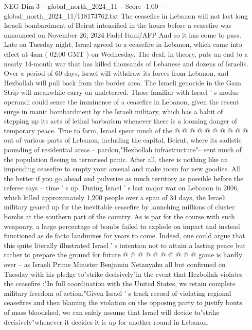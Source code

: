 \begin{textsample}{NEG Dim 3 – global\_north\_2024\_11 – Score -1.00 – global\_north\_2024\_11/118173762.txt}  \label{ex:f3_neg_282}
The ceasefire in Lebanon will not last long Israeli bombardment of Beirut intensified in the hours before a ceasefire was announced on November 26, 2024 Fadel Itani/AFP And so it has come to pass.
Late on Tuesday night, Israel agreed to a ceasefire in Lebanon, which came into effect at 4am ( 02:00 GMT ) on Wednesday.
The deal, in theory, puts an end to a nearly 14-month war that has killed thousands of Lebanese and dozens of Israelis.
Over a period of 60 days, Israel will withdraw its forces from Lebanon, and Hezbollah will pull back from the border area.
The Israeli genocide in the Gaza Strip will meanwhile carry on undeterred.
Those familiar with Israel ' s modus operandi could sense the imminence of a ceasefire in Lebanon, given the recent surge in manic bombardment by the Israeli military, which has a habit of stepping up its acts of lethal barbarism whenever there is a looming danger of temporary peace.
True to form, Israel spent much of the @ @ @ @ @ @ @ @ @ @ out of various parts of Lebanon, including the capital, Beirut, where its sadistic pounding of residential areas -- pardon,"Hezbollah infrastructure"-- sent much of the population fleeing in terrorised panic.
After all, there is nothing like an impending ceasefire to empty your arsenal and make room for new goodies.
All the better if you go ahead and pulverise as much territory as possible before the referee says -- time ' s up.
During Israel ' s last major war on Lebanon in 2006, which killed approximately 1,200 people over a span of 34 days, the Israeli military geared up for the inevitable ceasefire by launching millions of cluster bombs at the southern part of the country.
As is par for the course with such weaponry, a large percentage of bombs failed to explode on impact and instead functioned as de facto landmines for years to come.
Indeed, one could argue that this quite literally illustrated Israel ' s intention not to attain a lasting peace but rather to prepare the ground for future @ @ @ @ @ @ @ @ @ @ game is hardly over -- as Israeli Prime Minister Benjamin Netanyahu all but confirmed on Tuesday with his pledge to"strike decisively"in the event that Hezbollah violates the ceasefire :"In full coordination with the United States, we retain complete military freedom of action."Given Israel ' s track record of violating regional ceasefires and then blaming the violation on the opposing party to justify bouts of mass bloodshed, we can safely assume that Israel will decide to"strike decisively"whenever it decides it is up for another round in Lebanon.

\end{textsample}
